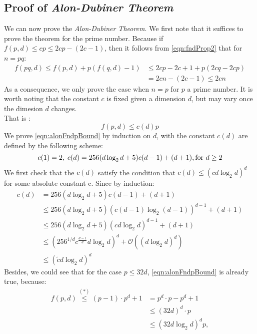 \documentclass[12pt]{article}
\theoremstyle{definition}
\numberwithin{equation}{theorem}
\numberwithin{figure}{theorem}
\newcommand{\alonDubinerTheorem}{\emph{Alon-Dubiner Theorem}}
\newcommand{\fnd}[2]{\ensuremath{f(#1,#2)}}
\newcommand{\bigO}[1]{\ensuremath{\mathcal{O}(#1)}}
\begin{document}
    \subsection{Proof of \alonDubinerTheorem}
    We can now prove the \alonDubinerTheorem{}. We first note that it suffices to prove the theorem
    for the prime number. Because if $\fnd{p}{d} \leq cp \leq 2cp - (2c - 1)$, then it follows from 
    \eqref{eqn:fndProp2} that for $n = pq$:
    \begin{align*}
        \fnd{pq}{d} \leq \fnd{p}{d} + p(\fnd{q}{d} - 1) &\leq 2cp - 2c + 1 + p (2cq - 2cp) \\
        &= 2cn - (2c - 1) \leq 2cn
    \end{align*}
    As a consequence, we only prove the case when $n = p$ for $p$ a prime number.
    It is worth noting that the constant $c$ is fixed given a dimension $d$, but may vary once the dimesion $d$ changes.\\
    That is :
    \begin{equation}\label{eqn:alonFndpBound}
        \fnd{p}{d}\leq c(d) p
    \end{equation}
    We prove \eqref{eqn:alonFndpBound} by induction on $d$, with the constant $c(d)$ are defined by the following scheme:
    \begin{equation}\label{eqn:alonCd_RecursiveForm}
        c(1) = 2, \; c(d) = 256(d\log_2 d + 5) c(d-1) + (d+1),\hfill \hbox{for } d\geq 2
    \end{equation}
    We first check that the $c(d)$ satisfy the condition that $c(d) \leq (cd\log_2 d)^d$ for some absolute constant c.
    Since by induction:
    \begin{align*}
        c(d) &= 256(d\log_2 d + 5) c(d-1) + (d+1) \\
            &\leq 256(d\log_2 d + 5) (c(d-1) \log_2 (d-1))^{d-1} + (d + 1)\\
            &\leq 256(d\log_2 d + 5) (cd \log_2 d)^{d-1} + (d + 1)\\
            & \leq (256^{1/d}c^{\frac{d-1}{d}} d \log_2 d)^{d} + \bigO{(d\log_2 d)^d}\\
            &\leq (\tilde{c}d\log_2 d)^d
    \end{align*}
    Besides, we could see that for the case $p \leq 32d$, \eqref{eqn:alonFndpBound} is already true, because:
    \begin{align*}
        \fnd{p}{d}\stackrel{(*)}{\leq} (p-1)\cdot p^d + 1 &= p^d \cdot p - p^d + 1\\
        &\leq (32d)^d \cdot p \\
        & \leq (32 d \log_2 d)^d p,
    \end{align*}
\end{document}
